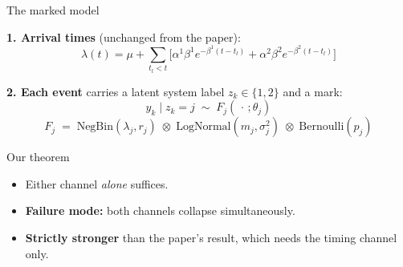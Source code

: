 \documentclass[aspectratio=169,11pt]{beamer}
\begin{document}
\begin{frame}{The marked model}
  \vspace{0.2cm}

  \textbf{1. Arrival times} (unchanged from the paper):
  $$\lambda(t) = \mu + \sum_{t_l < t}
    \Big[\alpha^1\beta^1 e^{-\beta^1(t-t_l)} + \alpha^2\beta^2 e^{-\beta^2(t-t_l)}\Big]$$

  \vspace{0.2cm}

  \textbf{2. Each event} carries a latent system label $z_k \in \{1,2\}$ and a mark:
  $$y_k \mid z_k = j \;\sim\; F_j(\,\cdot\,;\theta_j)$$
  $$F_j \;=\; \mathrm{NegBin}(\lambda_j, r_j) \;\otimes\; \mathrm{LogNormal}(m_j, \sigma_j^2) \;\otimes\; \mathrm{Bernoulli}(p_j)$$

  \vspace{0.4cm}

  \begin{center}
  \end{center}
\end{frame}

\begin{frame}{Our theorem}
  \vspace{0.6cm}
  \begin{center}
  \end{center}

  \vspace{0.6cm}

  \begin{itemize}
    \item Either channel \emph{alone} suffices.
    \item \textbf{Failure mode:} both channels collapse simultaneously.
    \item \textbf{Strictly stronger} than the paper's result, which needs the timing channel only.
  \end{itemize}
\end{frame}
\end{document}
